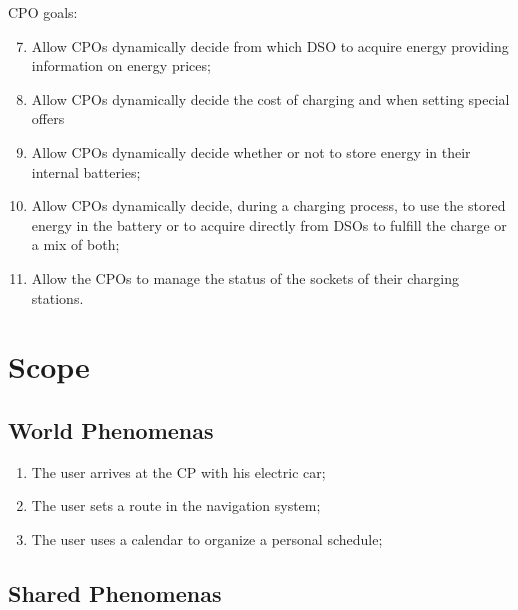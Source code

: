 \documentclass{Configuration_Files/PoliMi3i_thesis}
\begin{document}
CPO goals:
\begin{enumerate}[label=\textbf{G\arabic*}]\setcounter{enumi}{6}

    \item Allow CPOs dynamically decide from which DSO to acquire energy providing information on energy prices;

    \item Allow CPOs dynamically decide the cost of charging and when setting special offers

    \item Allow CPOs dynamically decide whether or not to store energy in their internal batteries;

    \item Allow CPOs dynamically decide, during a charging process, to use the stored energy in the battery or to acquire directly from DSOs to fulfill the charge or a mix of both;

    \item Allow the CPOs to manage the status of the sockets of their charging stations.

\end{enumerate}

\section{Scope}

\subsection{World Phenomenas}

\begin{enumerate}[label=\textbf{WP\arabic*}]
    \item The user arrives at the CP with his electric car;

    \item The user sets a route in the navigation system;

    \item The user uses a calendar to organize a personal schedule;
\end{enumerate}

\subsection{Shared Phenomenas}
\end{document}
